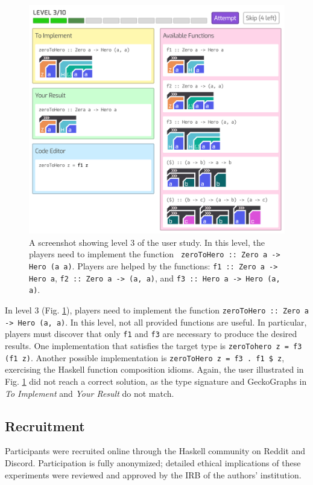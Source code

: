 \documentclass[preprint,12pt]{elsarticle}
\begin{document}
\begin{figure}[!h]
  \includegraphics[width=\linewidth]{figures/Level3}
  \caption{\label{fig:level3} A screenshot showing level 3 of the user study.  In this level, the players need to implement the function \texttt{ zeroToHero :: Zero a -> Hero (a a)}. Players are helped by the functions: {\tt f1 :: Zero a -> Hero a}, {\tt f2 :: Zero a -> (a, a)}, and {\tt f3 :: Hero a -> Hero (a, a)}.}
\end{figure}


In level 3 (Fig. \ref{fig:level3}),  players need to implement the function {\tt zeroToHero :: Zero a -> Hero (a, a)}.  In this level, not all provided functions are useful. In particular,  players must discover that only \texttt{f1} and \texttt{f3} are necessary to produce the desired results. One implementation that satisfies the target type is \texttt{zeroTohero z = f3 (f1 z)}. Another possible implementation is {\tt zeroToHero z = f3 . f1 \$ z}, exercising the Haskell function composition idioms. Again, the user illustrated in Fig. \ref{fig:level3} did not reach a correct solution, as the type signature and GeckoGraphs in {\it To Implement} and {\it Your Result} do not match.



\subsection{Recruitment}
Participants were recruited online through the Haskell community on Reddit and Discord. Participation is fully anonymized; detailed ethical implications of these experiments were reviewed and approved by the IRB of the authors' institution.
\end{document}
